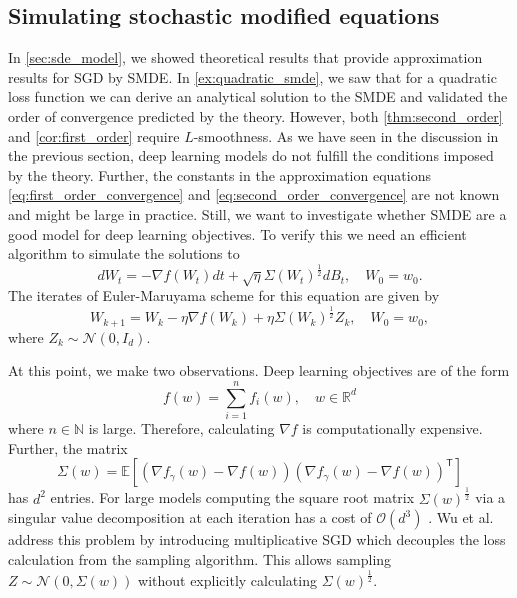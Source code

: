 \documentclass[12pt]{article}
\theoremstyle{definition}
\numberwithin{equation}{section}
\newcommand{\N}{\mathbb{N}}
\newcommand{\R}{\mathbb{R}}
\newcommand{\CN}{\mathcal{N}}
\newcommand{\CO}{\mathcal{O}}
\newcommand{\T}{\mathsf{T}}
\newcommand{\ev}[1]{\mathbb{E}\left[{#1}\right]}
\begin{document}
\subsection{Simulating stochastic modified equations}
In \autoref{sec:sde_model}, we showed theoretical results that provide approximation results for SGD by SMDE. 
In \autoref{ex:quadratic_smde}, we saw that for a quadratic loss function we can derive an analytical solution to the SMDE and validated the order of convergence predicted by the theory.
However, both \autoref{thm:second_order} and \autoref{cor:first_order} require $L$-smoothness. As we have seen in the discussion in the previous section, deep learning models do not fulfill the conditions imposed by the theory. Further, the constants in the approximation equations \eqref{eq:first_order_convergence} and \eqref{eq:second_order_convergence} are not known and might be large in practice. 
Still, we want to investigate whether SMDE are a good model for deep learning objectives. To verify this we need an efficient algorithm to simulate the solutions to 
\begin{equation}
  d W_t = -\nabla f(W_t) dt + \sqrt{\eta}\Sigma(W_t)^{\frac{1}{2}}dB_t, \quad W_0 = w_0.
\end{equation}
The iterates of Euler-Maruyama scheme for this equation are given by 
\begin{equation}
  W_{k+1} = W_k -\eta\nabla f(W_k) + \eta\Sigma(W_k)^{\frac{1}{2}} Z_k, \quad W_0 = w_0,
\end{equation}
where $Z_k \sim \CN(0, I_d)$.

At this point, we make two observations. Deep learning objectives are of the form
\begin{equation*}
  f(w) = \sum_{i=1}^n f_i(w), \quad w \in \R^d
\end{equation*}
where $n \in \N$ is large. Therefore, calculating $\nabla f$ is computationally expensive. Further, the matrix
\begin{equation*}
  \Sigma(w)= \ev{(\nabla f_{\gamma}(w) - \nabla f(w))(\nabla f_{\gamma}(w) - \nabla f(w))^\T}
\end{equation*}
has $d^2$ entries. For large models computing the square root matrix $\Sigma(w)^{\frac{1}{2}}$ via a singular value decomposition at each iteration has a cost of $\CO(d^3)$ \cite{golubMatrixComputations1996}.
Wu et al. \cite{wuNoisyGradientDescent2020a} address this problem by introducing multiplicative SGD which decouples the loss calculation from the sampling algorithm. This allows sampling $Z \sim \CN(0, \Sigma(w))$ without explicitly calculating $\Sigma(w)^{\frac{1}{2}}$.
\end{document}
